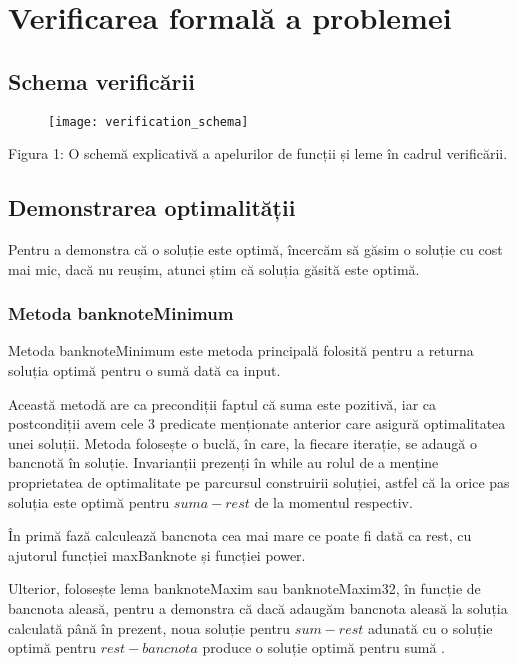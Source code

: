 

\chapter{Verificarea formală a problemei}

\section{Schema verificării}
    \vspace{1cm}
\setcounter{figure}{0}
    \begin{figure}[h]
        \centering
          \texttt{[image: verification\_schema]}
      \end{figure}
Figura 1: O schemă explicativă a apelurilor de funcții și leme în cadrul verificării.
    

\section{Demonstrarea optimalității}

    Pentru a demonstra că o soluție este optimă, încercăm să găsim o soluție cu cost mai mic, dacă nu reușim, atunci 
    știm că soluția găsită este optimă.\cite{kozen1993optimal}
  
  \subsection{Metoda banknoteMinimum}
    Metoda banknoteMinimum este metoda principală folosită pentru a returna soluția optimă pentru o sumă dată ca 
    input.\par
    Această metodă are ca precondiții faptul că suma este pozitivă, iar ca postcondiții avem cele 3 predicate menționate 
    anterior care asigură optimalitatea unei soluții. Metoda folosește o buclă, în care, la fiecare iterație, se 
    adaugă o bancnotă în soluție. Invarianții prezenți în while au rolul de a menține proprietatea de optimalitate 
    pe parcursul construirii soluției, astfel că la orice pas soluția este optimă pentru $suma-rest$ de la momentul respectiv.\par
    În primă fază calculează bancnota cea mai mare ce poate fi dată ca rest, cu ajutorul funcției maxBanknote și funcției 
    power.\par
    Ulterior, folosește lema banknoteMaxim sau banknoteMaxim32, în funcție de bancnota aleasă, pentru a demonstra 
    că dacă adaugăm bancnota aleasă la soluția calculată până în prezent, noua soluție pentru $sum-rest$ adunată cu o 
    soluție optimă pentru $rest - bancnota$ produce o soluție optimă pentru sumă .\par
    
